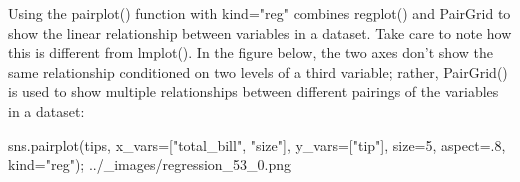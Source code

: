 \begin{frame}
Using the pairplot() function with kind="reg" combines regplot() and PairGrid to show the linear relationship between variables in a dataset. Take care to note how this is different from lmplot(). In the figure below, the two axes don’t show the same relationship conditioned on two levels of a third variable; rather, PairGrid() is used to show multiple relationships between different pairings of the variables in a dataset:

sns.pairplot(tips, x_vars=["total_bill", "size"], y_vars=["tip"],
             size=5, aspect=.8, kind="reg");
../_images/regression_53_0.png
\end{frame}

